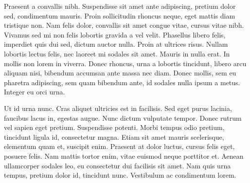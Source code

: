 \documentclass{book}
\begin{document}
\pstart {}Praesent a convallis nibh. Suspendisse sit amet ante adipiscing, pretium dolor sed, condimentum mauris. Proin sollicitudin rhoncus neque, eget mattis diam tristique non. Nam felis dolor, convallis sit amet congue vitae, cursus vitae nibh. Vivamus sed mi non felis lobortis gravida a vel velit. Phasellus libero felis, imperdiet quis dui sed, dictum auctor nulla. Proin at ultrices risus. Nullam lobortis lectus felis, nec laoreet mi sodales sit amet. Mauris in nulla erat. In mollis non lorem in viverra. Donec rhoncus, urna a lobortis tincidunt, libero arcu aliquam nisi, bibendum accumsan ante massa nec diam. Donec mollis, sem eu pharetra adipiscing, sem quam bibendum ante, id sodales nulla ipsum a metus. Integer eu orci urna.
\pend

\pstart {}Ut id urna nunc. Cras aliquet ultricies est in facilisis. Sed eget purus lacinia, faucibus lacus in, egestas augue. Nunc dictum vulputate tempor. Donec rutrum vel sapien eget pretium. Suspendisse potenti. Morbi tempus odio pretium, tincidunt ligula id, consectetur magna. Etiam sit amet mauris scelerisque, elementum quam et, suscipit enim. Praesent at dolor luctus, cursus felis eget, posuere felis. Nam mattis tortor enim, vitae euismod neque porttitor et. Aenean ullamcorper sodales leo, eu consectetur dui facilisis sit amet. Nam quis urna tempus, pretium dolor id, tincidunt nunc. Vestibulum ac condimentum lorem.
\pend

\endnumbering
\end{document}
